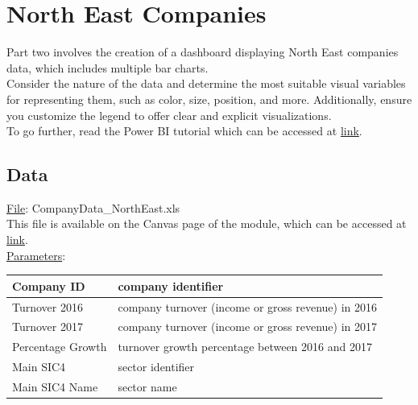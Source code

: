 \documentclass[11pt]{article}
\begin{document}
\clearpage

\section{North East Companies}

Part two involves the creation of a dashboard displaying North East companies data, which includes multiple bar charts.\\

Consider the nature of the data and determine the most suitable visual variables for representing them, such as color, size, position, and more. Additionally, ensure you customize the legend to offer clear and explicit visualizations.\\

To go further, read the Power BI tutorial which can be accessed at \href{https://learn.microsoft.com/en-us/power-bi/visuals/power-bi-visualization-customize-title-background-and-legend}{link}.

\subsection*{Data}

\underline{File}: CompanyData\_NorthEast.xls\\
This file is available on the Canvas page of the module, which can be accessed at \href{https://ncl.instructure.com/courses/49730}{link}.\\

\underline{Parameters}:

\begin{table}[h!]
    \centering
    \begin{tabular}{|l|m{8cm}|}
        \hline
        Company ID & company identifier \\
        \hline
        Turnover 2016 & company turnover (income or gross revenue) in 2016 \\
        \hline
        Turnover 2017 & company turnover (income or gross revenue) in 2017 \\
        \hline
        Percentage Growth & turnover growth percentage between 2016 and 2017 \\
        \hline
        Main SIC4 & sector identifier \\
        \hline
        Main SIC4 Name & sector name\\
        \hline
    \end{tabular}
\end{table}
\end{document}
